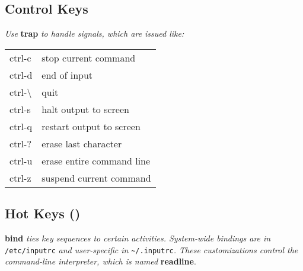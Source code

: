 \subsection*{Control Keys}

\textit{Use }\textbf{trap}\textit{ to handle signals, which are issued like:}\\
\begin{tabular}{l  l}
    ctrl-c & stop current command \\
    ctrl-d & end of input \\ 
    ctrl-\textbackslash & quit \\ 
    ctrl-s & halt output to screen \\ 
    ctrl-q & restart output to screen \\ 
    ctrl-? & erase last character \\ 
    ctrl-u & erase entire command line \\ 
    ctrl-z & suspend current command \\ 
\end{tabular}



\subsection*{Hot Keys ()}

\textbf{bind}\textit{ ties key sequences to certain activities. System-wide bindings are in }\texttt{/etc/inputrc}\textit{ and user-specific in }\texttt{\textasciitilde/.inputrc}\textit{. These customizations control the command-line interpreter, which is named }\textbf{readline}.\\
\\
\\
\\
\\
